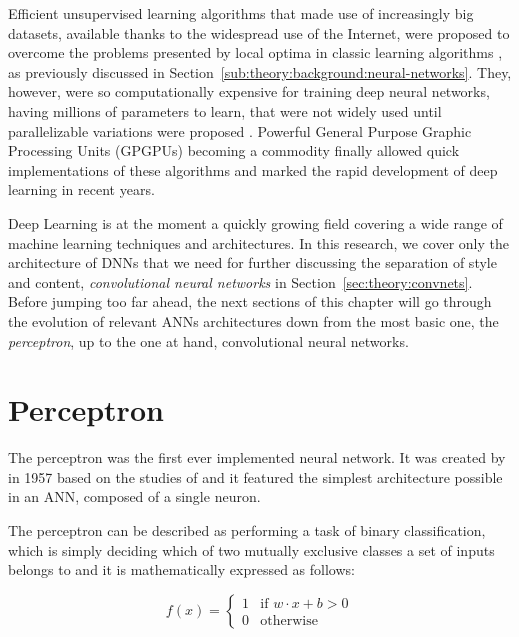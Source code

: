 Efficient unsupervised learning algorithms that made use of increasingly big datasets, available thanks to the widespread use of the Internet, were proposed to overcome the problems presented by local optima in classic learning algorithms \cite{Bottou2004,Hinton2006}, as previously discussed in Section~\ref{sub:theory:background:neural-networks}.
They, however, were so computationally expensive for training deep neural networks, having millions of parameters to learn, that were not widely used until parallelizable variations were proposed \cite{Dean2012,Chen2012}.
Powerful General Purpose Graphic Processing Units (GPGPUs) becoming a commodity finally allowed quick implementations of these algorithms and marked the rapid development of deep learning in recent years.

Deep Learning is at the moment a quickly growing field covering a wide range of machine learning techniques and architectures.
In this research, we cover only the architecture of DNNs that we need for further discussing the separation of style and content, \emph{convolutional neural networks} in Section~\ref{sec:theory:convnets}.
Before jumping too far ahead, the next sections of this chapter will go through the evolution of relevant ANNs architectures down from the most basic one, the \emph{perceptron}, up to the one at hand, convolutional neural networks.



\section{Perceptron}
\label{sec:theory:perceptron}

The perceptron was the first ever implemented neural network.
It was created by \citet{Rosenblatt1958} in 1957 based on the studies of \citet{McCulloch1943} and it featured the simplest architecture possible in an ANN, composed of a single neuron.

The perceptron can be described as performing a task of binary classification, which is simply deciding which of two mutually exclusive classes a set of inputs belongs to \cite{Freund1999} and it is mathematically expressed as follows:

\begin{equation}
  f(x) =
  \begin{cases}
    1 & \text{if } {w}\cdot{x}+b > 0\\
    0 & \text{otherwise}
  \end{cases}
\end{equation}


